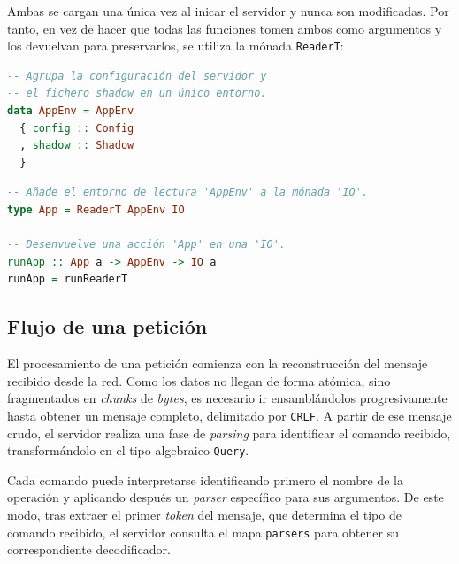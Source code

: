 \documentclass[a4paper]{CSMakotoTechnicalReport}
\begin{document}
Ambas se cargan una única vez al inicar el servidor y nunca son modificadas. Por tanto, en vez de hacer que todas las funciones tomen ambos como argumentos y los devuelvan para preservarlos, se utiliza la mónada \texttt{ReaderT}:

\vspace{-20pt}
\begin{minipage}[t]{0.40\textwidth}
\begin{lstlisting}[language=Haskell, frame=none, numbers=none, basicstyle=\footnotesize]
-- Agrupa la configuración del servidor y
-- el fichero shadow en un único entorno.
data AppEnv = AppEnv
  { config :: Config
  , shadow :: Shadow
  }
\end{lstlisting}
\vspace{-4pt}
\captionsetup{type=lstlisting}
\caption{Entorno de la aplicación.}
\end{minipage}
\hfill
\begin{minipage}[t]{0.55\textwidth}
\begin{lstlisting}[language=Haskell, frame=none, numbers=none, basicstyle=\footnotesize]
-- Añade el entorno de lectura 'AppEnv' a la mónada 'IO'.
type App = ReaderT AppEnv IO

-- Desenvuelve una acción 'App' en una 'IO'.
runApp :: App a -> AppEnv -> IO a
runApp = runReaderT
\end{lstlisting}
\vspace{-4pt}
\captionsetup{type=lstlisting}
\caption{Definición de la mónada App.}
\end{minipage}


\subsection{Flujo de una petición}
El procesamiento de una petición comienza con la reconstrucción del mensaje recibido desde la red. Como los datos no llegan de forma atómica, sino fragmentados en \textit{chunks} de \textit{bytes}, es necesario ir ensamblándolos progresivamente hasta obtener un mensaje completo, delimitado por \texttt{CRLF}. A partir de ese mensaje crudo, el servidor realiza una fase de \textit{parsing} para identificar el comando recibido, transformándolo en el tipo algebraico \texttt{Query}.

Cada comando puede interpretarse identificando primero el nombre de la operación y aplicando después un \textit{parser} específico para sus argumentos. De este modo, tras extraer el primer \textit{token} del mensaje, que determina el tipo de comando recibido, el servidor consulta el mapa \texttt{parsers} para obtener su correspondiente decodificador.
\end{document}
